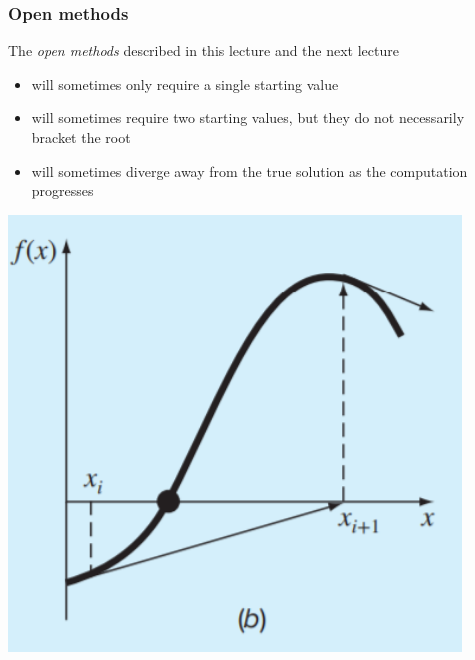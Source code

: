 \documentclass{if-beamer}
\begin{document}
\begin{frame}
\frametitle{Open methods}
\begin{minipage}{0.5\textwidth}
	The \textit{open methods} described in this lecture and the next lecture\\\vspace{7pt} 
	\begin{itemize}
		\item will sometimes only require a single starting value \\\vspace{2pt}
		\item will sometimes require two starting values, but they do not necessarily bracket the root \\\vspace{2pt}
		\item will sometimes diverge away from the true solution as the computation progresses \\\vspace{2pt}
	\end{itemize}
\end{minipage} 
\begin{minipage}{0.5\textwidth}
	\centering
	\includegraphics[width = 0.9\textwidth]{figures/diverging}
\end{minipage}
\end{frame}
\end{document}

